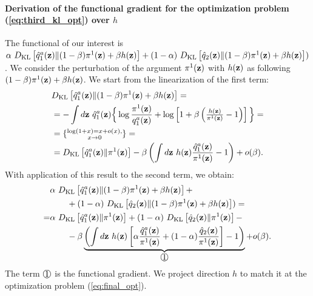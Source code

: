 \paragraph{Derivation of the functional gradient for the optimization problem (\ref{eq:third_kl_opt}) over $h$}
The functional of our interest is $\alpha~D_{\mathrm{KL}}\left[\hat{q}_{1}^{a}({\mathbf{z}})\|(1-\beta)\pi^{1}({\mathbf{z}})+\beta h({\mathbf{z}})\right] +  (1-\alpha)~D_{\mathrm{KL}}\left[\hat{q}_{2}({\mathbf{z}})\|(1-\beta)\pi^{1}({\mathbf{z}})+\beta h({\mathbf{z}})\right])$.
We consider the perturbation of the argument $\pi^{1}({\mathbf{z}})$ with $h({\mathbf{z}})$ as following $(1-\beta)\pi^{1}({\mathbf{z}})+\beta h({\mathbf{z}})$. We start from the linearization of the first term:
\begin{equation}
    \begin{aligned}
     & D_{\mathrm{KL}}\left[\hat{q}_{1}^{a}({\mathbf{z}})\|(1-\beta)\pi^{1}({\mathbf{z}})+\beta h({\mathbf{z}})\right] = \\
     & = -\int d{\mathbf{z}}~\hat{q}_{1}^{a}({\mathbf{z}})\Big\{\log\frac{\pi^{1}({\mathbf{z}})}{{q}_{1}^{a}({\mathbf{z}})}+\log \left[1+\beta \left(\tfrac{h({\mathbf{z}})}{\pi^{1}({\mathbf{z}})}- 1\right)\right]\Big\} = \\ 
     & = \{\substack{\log(1+x) = x + o(x),\\ x\to 0}\} =  \\
     & = D_{\mathrm{KL}}\left[\hat{q}_{1}^{a}({\mathbf{z}})\|\pi^{1}({\mathbf{z}})\right] - \beta\left(\int d{\mathbf{z}}~h({\mathbf{z}}) \frac{\hat{q}_{1}^{a}({\mathbf{z}})}{\pi^{1}({\mathbf{z}})} - 1\right) + o(\beta).
    \end{aligned}
\end{equation}
With application of this result to the second term, we obtain:
\begin{equation}
    \begin{aligned}
     &\alpha~\KL{\hat{q}_{1}^{a}(\rvz)}{(1-\beta)\pi^{1}(\rvz)+\beta h(\rvz)} +  \\
     & \quad\quad + (1-\alpha)~\KL{\hat{q}_{2}(\rvz)}{(1-\beta)\pi^{1}(\rvz)+\beta h(\rvz)}) = \\
    = &\alpha~\KL{\hat{q}_{1}^{a}(\rvz)}{\pi^{1}(\rvz)} + (1-\alpha)~\KL{\hat{q}_{2}(\rvz)}{\pi^{1}(\rvz)} - \\
    & \quad\quad- \beta\underbrace{\left(\int d\rvz~h(\rvz)\left[\alpha \frac{\hat{q}_{1}^{a}(\rvz)}{\pi^{1}(\rvz)} + (1-\alpha)\frac{\hat{q}_{2}(\rvz)}{\pi^{1}(\rvz)}\right]- 1\right)}_{ \raisebox{.5pt}{\textcircled{\raisebox{-.9pt} {\text{\ttfamily \normalfont 1}}}}} + o(\beta).
    \end{aligned}
\end{equation}
The term $\raisebox{.5pt}{\textcircled{\raisebox{-.9pt} {\text{\ttfamily \normalfont 1}}}}$ is the functional gradient. We project direction $h$ to match it at the optimization problem (\ref{eq:final_opt}).

